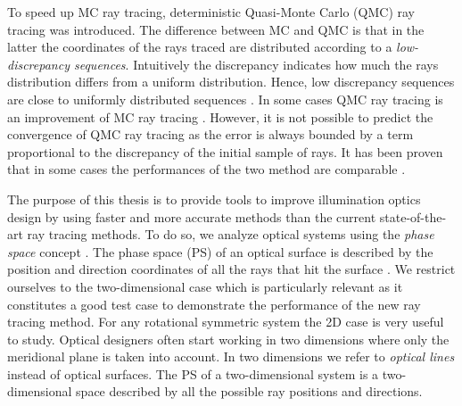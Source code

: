 To speed up MC ray tracing, deterministic Quasi-Monte Carlo (QMC) ray tracing was introduced. The difference between MC and QMC is that in the latter the coordinates of the rays traced are distributed according to a \textit{low-discrepancy sequences}. Intuitively the discrepancy indicates how much the rays distribution differs from a uniform distribution.  Hence, low discrepancy sequences are close to uniformly distributed sequences \cite{levy2002introduction}.
In some cases QMC ray tracing is an improvement of MC ray tracing \cite{ohbuchi1996quasi, caflisch1998monte}. However, it is not possible to predict the convergence of QMC ray tracing as the error is always bounded by a term proportional to the discrepancy of the initial sample of rays. It has been proven that in some cases the performances of the two method are comparable \cite{tuffin2004randomization}.

The purpose of this thesis is to provide tools to improve illumination optics design by using faster and more accurate methods than the current state-of-the-art ray tracing methods.
To do so, we analyze optical systems using the \textit{phase space} concept \cite{torre2005linear}.
The phase space (PS) of an optical surface is described by the position and direction coordinates of all the rays that hit the surface \cite{testorf2009phase}. We restrict ourselves to the two-dimensional case which is particularly relevant as it constitutes a good test case to
demonstrate the performance of the new ray tracing method. For any rotational symmetric
system the 2D case is very useful to study. Optical designers often start working in two dimensions where only the
meridional plane is taken into account. In two dimensions we refer to \textit{optical lines} instead of optical surfaces. The PS of a two-dimensional system is a two-dimensional space described by all the possible ray positions and directions. 

